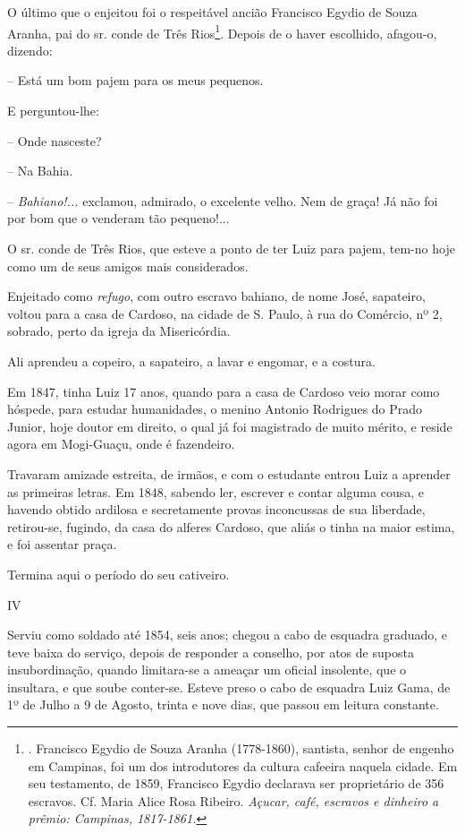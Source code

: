 O último que o enjeitou foi o respeitável ancião Francisco Egydio de
Souza Aranha, pai do sr. conde de Três Rios\footnote{. Francisco Egydio
  de Souza Aranha (1778-1860), santista, senhor de engenho em Campinas,
  foi um dos introdutores da cultura cafeeira naquela cidade. Em seu
  testamento, de 1859, Francisco Egydio declarava ser proprietário de
  356 escravos. Cf. Maria Alice Rosa Ribeiro. \emph{Açucar, café,
  escravos e dinheiro a prêmio: Campinas, 1817-1861.}}. Depois de o
haver escolhido, afagou-o, dizendo:

-- Está um bom pajem para os meus pequenos.

E perguntou-lhe:

-- Onde nasceste?

-- Na Bahia.

-- \emph{Bahiano!...} exclamou, admirado, o excelente velho. Nem de
graça! Já não foi por bom que o venderam tão pequeno!...

O sr. conde de Três Rios, que esteve a ponto de ter Luiz para pajem,
tem-no hoje como um de seus amigos mais considerados.

Enjeitado como \emph{refugo}, com outro escravo bahiano, de nome José,
sapateiro, voltou para a casa de Cardoso, na cidade de S. Paulo, à rua
do Comércio, nº 2, sobrado, perto da igreja da Misericórdia.

Ali aprendeu a copeiro, a sapateiro, a lavar e engomar, e a costura.

Em 1847, tinha Luiz 17 anos, quando para a casa de Cardoso veio morar
como hóspede, para estudar humanidades, o menino Antonio Rodrigues do
Prado Junior, hoje doutor em direito, o qual já foi magistrado de muito
mérito, e reside agora em Mogi-Guaçu, onde é fazendeiro.

Travaram amizade estreita, de irmãos, e com o estudante entrou Luiz a
aprender as primeiras letras. Em 1848, sabendo ler, escrever e contar
alguma cousa, e havendo obtido ardilosa e secretamente provas
inconcussas de sua liberdade, retirou-se, fugindo, da casa do alferes
Cardoso, que aliás o tinha na maior estima, e foi assentar praça.

Termina aqui o período do seu cativeiro.

IV

Serviu como soldado até 1854, seis anos; chegou a cabo de esquadra
graduado, e teve baixa do serviço, depois de responder a conselho, por
atos de suposta insubordinação, quando limitara-se a ameaçar um oficial
insolente, que o insultara, e que soube conter-se. Esteve preso o cabo
de esquadra Luiz Gama, de 1º de Julho a 9 de Agosto, trinta e nove dias,
que passou em leitura constante.

